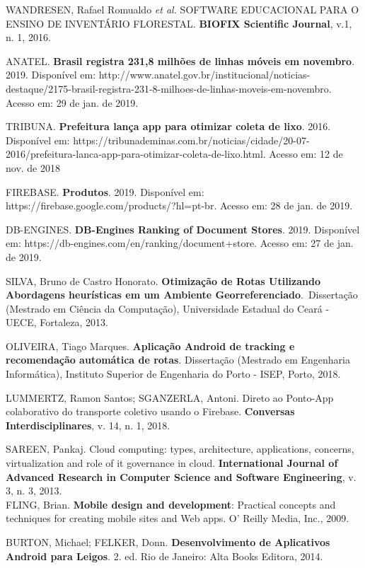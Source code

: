 
\cite{WANDRESEN:2016}
WANDRESEN, Rafael Romualdo \textit{et al.} SOFTWARE EDUCACIONAL PARA O ENSINO DE INVENTÁRIO
FLORESTAL. \textbf{BIOFIX Scientific Journal}, v.1, n. 1, 2016.


ANATEL. \textbf{Brasil registra 231,8 milhões de linhas móveis em novembro}. 2019. Disponível
em: http://www.anatel.gov.br/institucional/noticias-destaque/2175-brasil-registra-231-8-milhoes-de-linhas-moveis-em-novembro.
Acesso em: 29 de jan. de 2019.


TRIBUNA. \textbf{Prefeitura lança app para otimizar coleta de lixo}. 2016. Disponível em:
https://tribunademinas.com.br/noticias/cidade/20-07-2016/prefeitura-lanca-app-para-otimizar-coleta-de-lixo.html.
Acesso em: 12 de nov. de 2018


FIREBASE. \textbf{Produtos}. 2019. Disponível em:
https://firebase.google.com/products/?hl=pt-br. Acesso em: 28 de jan. de 2019.


DB-ENGINES. \textbf{DB-Engines Ranking of Document Stores}. 2019. Disponível em:
https://db-engines.com/en/ranking/document+store. Acesso em: 27 de jan. de 2019.


SILVA, Bruno de Castro Honorato. \textbf{Otimização de Rotas Utilizando Abordagens
heurísticas em um Ambiente Georreferenciado}.\ Dissertação (Mestrado em Ciência da
Computação), Universidade Estadual do Ceará - UECE, Fortaleza,  2013.


OLIVEIRA, Tiago Marques. \textbf{Aplicação Android de tracking e recomendação automática de
rotas}. Dissertação (Mestrado em Engenharia Informática), Instituto Superior de Engenharia do
Porto - ISEP, Porto, 2018.


LUMMERTZ, Ramon Santos; SGANZERLA, Antoni. Direto ao Ponto-App colaborativo do transporte
coletivo usando o Firebase. \textbf{Conversas Interdisciplinares}, v. 14, n. 1, 2018.


SAREEN, Pankaj. Cloud computing: types, architecture, applications, concerns, virtualization
and role of it governance in cloud. \textbf{International Journal of Advanced Research in
Computer Science and Software Engineering}, v. 3, n. 3, 2013. \\


FLING, Brian. \textbf{Mobile design and development}: Practical concepts and techniques for
creating mobile sites and Web apps. O' Reilly Media, Inc., 2009.


 BURTON, Michael; FELKER, Donn. \textbf{Desenvolvimento de Aplicativos Android para Leigos}.
2. ed. Rio de Janeiro: Alta Books Editora, 2014.


